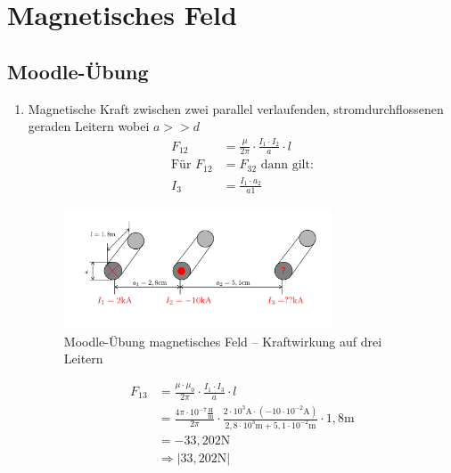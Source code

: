\section{Magnetisches Feld}
\subsection{Moodle-Übung}
\begin{enumerate}
  \item Magnetische Kraft zwischen zwei parallel verlaufenden, stromdurchflossenen geraden Leitern wobei $a >> d$
    \begin{align*}
      F_{12}&= \frac{\mu}{2\pi}\cdot \frac{I_1\cdot I_2}{a}\cdot l\\
      \text{Für } F_{12} &= F_{32} \text{ dann gilt:}\\
      I_3 &= \frac{I_1\cdot a_2}{a1}
    \end{align*}
    \begin{figure}[h!]
      \begin{center}
        \includegraphics[width=0.75\textwidth]{img/Magnetisches-Feld/A1.png}
      \end{center}
      \caption{Moodle-Übung magnetisches Feld – Kraftwirkung auf drei Leitern}
  \end{figure}
  \begin{align*}
    F_{13}&=\frac{\mu\cdot\mu_{0}}{2\pi}\cdot\frac{I_{1}\cdot I_{3}}{a}\cdot l\\
      &=\frac{4\pi\cdot 10^{-7}\frac{\text{H}}{\text{m}}}{2\pi}\cdot\frac{2\cdot 10^{3}\text{A}\cdot(-10\cdot 10^{-2}\text{A})}{2,8\cdot 10^{3}\text{m}+5,1\cdot 10^{-2}\text{m}}\cdot 1,8\text{m}\\
      &=-33,202\text{N}\\
      &\Rightarrow |33,202\text{N}|\\
    \end{align*}
  
  
\end{enumerate}
